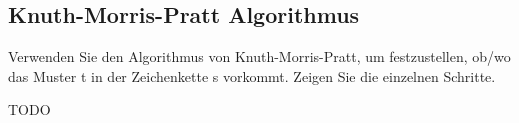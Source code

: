 \subsection{Knuth-Morris-Pratt Algorithmus}
Verwenden Sie den Algorithmus von Knuth-Morris-Pratt, um festzustellen,
ob/wo das Muster t in der Zeichenkette s vorkommt.
Zeigen Sie die einzelnen Schritte.

\alert{TODO}
